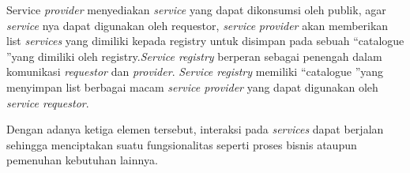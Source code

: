 Service \textit{provider} menyediakan \textit{service} yang dapat dikonsumsi oleh publik, agar \textit{service} nya dapat digunakan oleh requestor, \textit{service} \textit{provider} akan memberikan list \textit{services} yang dimiliki kepada registry untuk disimpan pada sebuah \textquotedblleft catalogue \textquotedblright yang dimiliki oleh registry.\textit{Service registry} berperan sebagai penengah dalam komunikasi \textit{requestor} dan \textit{provider}. \textit{Service registry} memiliki \textquotedblleft catalogue \textquotedblright yang menyimpan list berbagai macam \textit{service provider} yang dapat digunakan oleh \textit{service requestor}.

Dengan adanya ketiga elemen tersebut, interaksi pada \textit{services} dapat berjalan sehingga menciptakan suatu fungsionalitas seperti proses bisnis ataupun pemenuhan kebutuhan lainnya.
